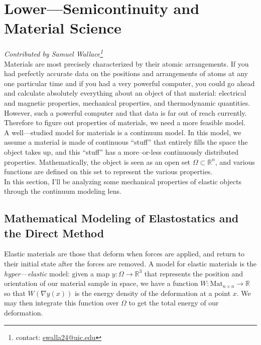 \documentclass[../main.tex]{subfiles}
\begin{document}
\chapter{Lower---Semicontinuity and Material Science}

\emph{Contributed by Samuel Wallace\footnote{contact: \href{mailto:swalla24@uic.edu}{swalla24@uic.edu}}} \\

Materials are most precisely characterized by their atomic arrangements.
If you had perfectly accurate data on the positions and arrangements of atoms at any one particular time and if you had a very powerful computer, you could go ahead and calculate absolutely everything about an object of that material: electrical and magnetic properties, mechanical properties, and thermodynamic quantities.
However, such a powerful computer and that data is far out of reach currently.
Therefore to figure out properties of materials, we need a more feasible model. \\

A well---studied model for materials is a continuum model.
In this model, we assume a material is made of continuous ``stuff'' that entirely fills the space the object takes up, and this ``stuff'' has a more--or-less continuously distributed properties.
Mathematically, the object is seen as an open set $\Omega \subset \mathbb{R}^n$, and various functions are defined on this set to represent the various properties. \\

In this section, I'll be analyzing some mechanical properties of elastic objects through the continuum modeling lens.

\section{Mathematical Modeling of Elastostatics and the Direct Method}

Elastic materials are those that deform when forces are applied, and return to their initial state after the forces are removed.
A model for elastic materials is the \emph{hyper---elastic} model: given a map $y: \Omega \to \mathbb{R}^3$ that represents the position and orientation of our material sample in space, we have a function $W: \mathrm{Mat}_{n\times n} \to \mathbb{R}$ so that $W(\nabla y(x))$ is the energy density of the deformation at a point $x$.
We may then integrate this function over $\Omega$ to get the total energy of our deformation. \\
\end{document}
